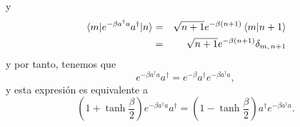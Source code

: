 \documentclass[%
 reprint,
 amsmath,amssymb,
 aps,
 pra,
]{revtex4-2}
\begin{document}
y
\begin{eqnarray}
	\mel{m}{e^{-\beta a^\dag a }a^\dag}{n} 	&=& \sqrt{n+1}e^{-\beta (n+1)} \braket{m}{n+1} \nonumber\\
											&=&  \sqrt{n+1}e^{-\beta (n+1)} \delta_{m,\,n+1} \label{eq:mel-4}
\end{eqnarray}
y por tanto, tenemos que
\begin{equation}
	e^{-\beta a^\dag a} a^\dag = e^{-\beta} a^\dag e^{-\beta a^\dag a}, 
\end{equation}
y esta expresión es equivalente a 
\begin{equation}
	\left(1+\tanh\frac{\beta}{2}\right)e^{-\beta a^\dag a} a^\dag = \left(1-\tanh\frac{\beta}{2}\right) a^\dag e^{-\beta a^\dag a}.\label{eq:relation-adag-times-exp}
\end{equation}
\end{document}
